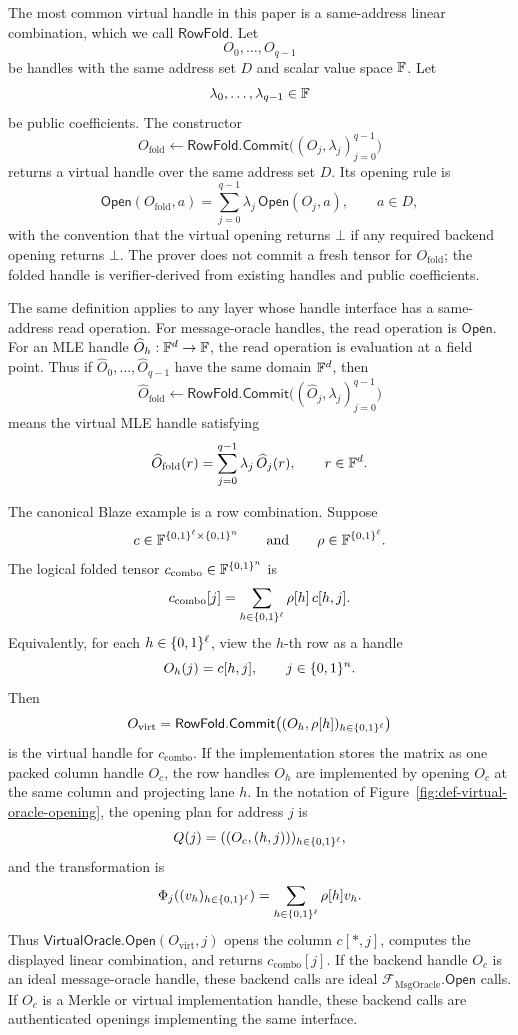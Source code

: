 The most common virtual handle in this paper is a same-address linear
combination, which we call \(\mathsf{RowFold}\).  Let
\[
  O_0,\ldots,O_{q-1}
\]
be handles with the same address set \(D\) and scalar value space \(\mathbb{F}\).  Let
\[
  \lambda_0,\ldots,\lambda_{q-1}\in\mathbb{F}
\]
be public coefficients.  The constructor
\[
  O_{\mathrm{fold}}
  \gets
  \mathsf{RowFold.Commit}\bigl((O_j,\lambda_j)_{j=0}^{q-1}\bigr)
\]
returns a virtual handle over the same address set \(D\).  Its opening rule is
\[
  \mathsf{Open}(O_{\mathrm{fold}},a)
  =
  \sum_{j=0}^{q-1}
    \lambda_j\,\mathsf{Open}(O_j,a),
  \qquad a\in D,
\]
with the convention that the virtual opening returns \(\bot\) if any required
backend opening returns \(\bot\).  The prover does not commit a fresh tensor
for \(O_{\mathrm{fold}}\); the folded handle is verifier-derived from existing
handles and public coefficients.

The same definition applies to any layer whose handle interface has a
same-address read operation.  For message-oracle handles, the read operation is
\(\mathsf{Open}\).  For an MLE handle
\(\widehat O_h:\mathbb{F}^d\to\mathbb{F}\), the read operation is evaluation at a field point.
Thus if \(\widehat O_0,\ldots,\widehat O_{q-1}\) have the same domain \(\mathbb{F}^d\),
then
\[
  \widehat O_{\mathrm{fold}}
  \gets
  \mathsf{RowFold.Commit}\bigl((\widehat O_j,\lambda_j)_{j=0}^{q-1}\bigr)
\]
means the virtual MLE handle satisfying
\[
  \widehat O_{\mathrm{fold}}(r)
  =
  \sum_{j=0}^{q-1}\lambda_j\,\widehat O_j(r),
  \qquad r\in\mathbb{F}^d.
\]

The canonical Blaze example is a row combination.  Suppose
\[
  c\in\mathbb{F}^{\{0,1\}^\ell\times\{0,1\}^n}
  \qquad\text{and}\qquad
  \rho\in\mathbb{F}^{\{0,1\}^\ell}.
\]
The logical folded tensor \(c_{\mathrm{combo}}\in\mathbb{F}^{\{0,1\}^n}\) is
\[
  c_{\mathrm{combo}}[j]
  =
  \sum_{h\in\{0,1\}^\ell}\rho[h]\,c[h,j].
\]
Equivalently, for each \(h\in\{0,1\}^\ell\), view the \(h\)-th row as a handle
\[
  O_h(j)=c[h,j],\qquad j\in\{0,1\}^n.
\]
Then
\[
  O_{\mathrm{virt}}
  =
  \mathsf{RowFold.Commit}\bigl((O_h,\rho[h])_{h\in\{0,1\}^\ell}\bigr)
\]
is the virtual handle for \(c_{\mathrm{combo}}\).  If the implementation stores
the matrix as one packed column handle \(O_c\), the row handles \(O_h\) are
implemented by opening \(O_c\) at the same column and projecting lane \(h\).
In the notation of Figure~\ref{fig:def-virtual-oracle-opening}, the opening plan
for address \(j\) is
\[
  Q(j)=((O_c,(h,j)))_{h\in\{0,1\}^\ell},
\]
and the transformation is
\[
  \Phi_j((v_h)_{h\in\{0,1\}^\ell})
  =
  \sum_{h\in\{0,1\}^\ell}\rho[h]v_h.
\]
Thus \(\mathsf{VirtualOracle.Open}(O_{\mathrm{virt}},j)\) opens the column
\(c[\ast,j]\), computes the displayed linear combination, and returns
\(c_{\mathrm{combo}}[j]\).  If the backend handle \(O_c\) is an ideal
message-oracle handle, these backend calls are ideal
\(\mathcal F_{\mathrm{MsgOracle}}.\mathsf{Open}\) calls.  If \(O_c\) is a
Merkle or virtual implementation handle, these backend calls are authenticated
openings implementing the same interface.

